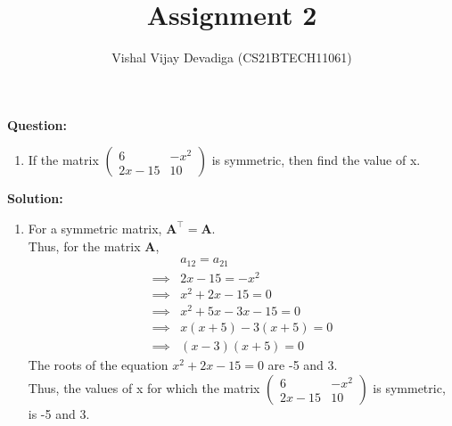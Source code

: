 \documentclass[journal,12pt,twocolumn]{IEEEtran}
\title{Assignment 2}
\author{Vishal Vijay Devadiga (CS21BTECH11061)}
\date{}
\let\vec\mathbf
\newcommand{\myvec}[1]{\ensuremath{\begin{pmatrix}#1\end{pmatrix}}}
\newcommand{\question}{\noindent \textbf{Question: }}
\newcommand{\solution}{\noindent \textbf{Solution: }}
\begin{document}
\maketitle
\question
\begin{enumerate}[label=]
	\item If the matrix $\myvec{6 & -x^2 \\ 2x - 15 & 10}$ is symmetric, then find the value of x.
\end{enumerate}
\solution
\begin{enumerate}[label=]
	\item For a symmetric matrix, $\vec{A}^{\top} = \vec{A}$. \\
	Thus, for the matrix $\vec{A}$,
	\begin{align}
		&a_{12} = a_{21}
		\\
		\implies &2x - 15 = -x^2
		\\
		\implies &x^2 + 2x - 15 = 0
		\\
		\implies &x^2 + 5x - 3x -15 = 0
		\\
		\implies &x(x+5) - 3(x+5) =0
		\\
		\implies &(x-3)(x+5) = 0
	\end{align}
	The roots of the equation $x^2 + 2x -15 = 0$ are -5 and 3. \\
	Thus, the values of x for which the matrix $\myvec{6 & -x^2 \\ 2x - 15 & 10}$ is symmetric, is -5 and 3.
	
\end{enumerate}
\end{document}
